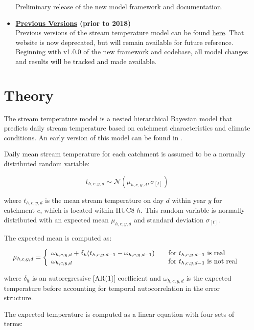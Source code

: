 \documentclass[]{book}
\begin{document}
\begin{itemize}
  Preliminary release of the new model framework and documentation.
\item
  \textbf{\href{https://conte-ecology.github.io/conteStreamTemperature_northeast/}{Previous Versions} (prior to 2018)}\\
  Previous versions of the stream temperature model can be found \href{https://conte-ecology.github.io/conteStreamTemperature_northeast/}{here}. That website is now deprecated, but will remain available for future reference. Beginning with v1.0.0 of the new framework and codebase, all model changes and results will be tracked and made available.
\end{itemize}

\hypertarget{theory}{%
\chapter{Theory}\label{theory}}

The stream temperature model is a nested hierarchical Bayesian model that predicts daily stream temperature based on catchment characteristics and climate conditions. An early version of this model can be found in \citet{Letcher2016}.

Daily mean stream temperature for each catchment is assumed to be a normally distributed random variable:

\[t_{h,c,y,d} \sim \mathcal{N}(\mu_{h,c,y,d},\sigma_{[t]})\]

where \(t_{h,c,y,d}\) is the mean stream temperature on day \(d\) within year \(y\) for catchment \(c\), which is located within HUC8 \(h\). This random variable is normally distributed with an expected mean \(\mu_{h,c,y,d}\) and standard deviation \(\sigma_{[t]}\).

The expected mean is computed as:

\[
\mu_{h,c,y,d} = \left \{ \begin{array}{l l}
  \omega_{h,c,y,d} + \delta_{h}(t_{h,c,y,d-1} - \omega_{h,c,y,d-1}) & \quad \text{for } t_{h,c,y,d-1} \text{ is real} \\
  \omega_{h,c,y,d} & \quad \text{for } t_{h,c,y,d-1} \text{ is not real}
  \end{array} \right.
\]

where \(\delta_h\) is an autoregressive {[}AR(1){]} coefficient and \(\omega_{h,c,y,d}\) is the expected temperature before accounting for temporal autocorrelation in the error structure.

The expected temperature is computed as a linear equation with four sets of terms:
\end{document}
